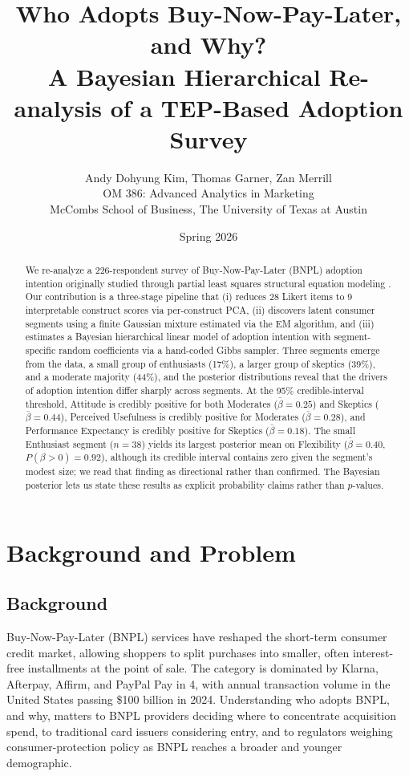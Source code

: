 \documentclass[11pt]{article}
\title{\vspace{-1.2cm}%
  {\Large Who Adopts Buy-Now-Pay-Later, and Why?}\\[6pt]
  {\normalsize A Bayesian Hierarchical Re-analysis of a TEP-Based Adoption Survey}%
}
\author{%
  Andy Dohyung Kim, Thomas Garner, Zan Merrill \\[4pt]
  \small OM 386: Advanced Analytics in Marketing \\
  \small McCombs School of Business, The University of Texas at Austin%
}
\date{Spring 2026}
\begin{document}
\maketitle

\begin{abstract}
\noindent We re-analyze a 226-respondent survey of Buy-Now-Pay-Later (BNPL) adoption
intention originally studied through partial least squares structural
equation modeling \citep{dadra2024tep}. Our contribution is a three-stage
pipeline that (i) reduces 28 Likert items to 9 interpretable construct
scores via per-construct PCA, (ii) discovers latent consumer segments
using a finite Gaussian mixture estimated via the EM algorithm, and
(iii) estimates a Bayesian hierarchical linear model of adoption intention
with segment-specific random coefficients via a hand-coded Gibbs sampler.
Three segments emerge from the data, a small group of enthusiasts (17\%),
a larger group of skeptics (39\%), and a moderate majority (44\%), and
the posterior distributions reveal that the drivers of adoption
intention differ sharply across segments. At the 95\% credible-interval
threshold, Attitude is credibly positive for both Moderates
($\bar{\beta} = 0.25$) and Skeptics ($\bar{\beta} = 0.44$),
Perceived Usefulness is credibly positive for Moderates
($\bar{\beta} = 0.28$), and Performance Expectancy is credibly
positive for Skeptics ($\bar{\beta} = 0.18$). The small Enthusiast segment ($n = 38$) yields
its largest posterior mean on Flexibility ($\bar{\beta} = 0.40$,
$P(\beta > 0) = 0.92$), although its credible interval contains zero
given the segment's modest size; we read that finding as directional
rather than confirmed. The Bayesian posterior lets us state these
results as explicit probability claims rather than $p$-values.
\end{abstract}

\section{Background and Problem}

\subsection{Background}

Buy-Now-Pay-Later (BNPL) services have reshaped the short-term consumer
credit market, allowing shoppers to split purchases into smaller, often
interest-free installments at the point of sale. The category is dominated
by Klarna, Afterpay, Affirm, and PayPal Pay in 4, with annual transaction
volume in the United States passing \$100 billion in 2024. Understanding
who adopts BNPL, and why, matters to BNPL providers deciding where to
concentrate acquisition spend, to traditional card issuers considering
entry, and to regulators weighing consumer-protection policy as BNPL
reaches a broader and younger demographic.
\end{document}

